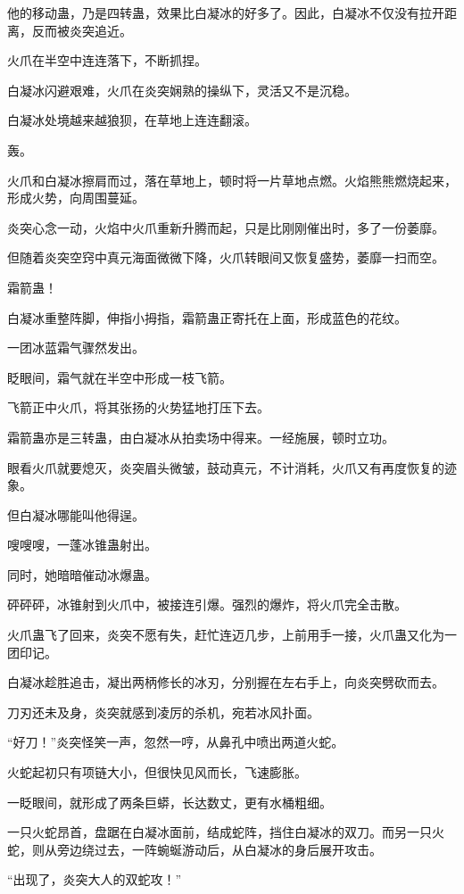 \begin{this_body}
他的移动蛊，乃是四转蛊，效果比白凝冰的好多了。因此，白凝冰不仅没有拉开距离，反而被炎突追近。

火爪在半空中连连落下，不断抓捏。

白凝冰闪避艰难，火爪在炎突娴熟的操纵下，灵活又不是沉稳。

白凝冰处境越来越狼狈，在草地上连连翻滚。

轰。

火爪和白凝冰擦肩而过，落在草地上，顿时将一片草地点燃。火焰熊熊燃烧起来，形成火势，向周围蔓延。

炎突心念一动，火焰中火爪重新升腾而起，只是比刚刚催出时，多了一份萎靡。

但随着炎突空窍中真元海面微微下降，火爪转眼间又恢复盛势，萎靡一扫而空。

霜箭蛊！

白凝冰重整阵脚，伸指小拇指，霜箭蛊正寄托在上面，形成蓝色的花纹。

一团冰蓝霜气骤然发出。

眨眼间，霜气就在半空中形成一枝飞箭。

飞箭正中火爪，将其张扬的火势猛地打压下去。

霜箭蛊亦是三转蛊，由白凝冰从拍卖场中得来。一经施展，顿时立功。

眼看火爪就要熄灭，炎突眉头微皱，鼓动真元，不计消耗，火爪又有再度恢复的迹象。

但白凝冰哪能叫他得逞。

嗖嗖嗖，一蓬冰锥蛊射出。

同时，她暗暗催动冰爆蛊。

砰砰砰，冰锥射到火爪中，被接连引爆。强烈的爆炸，将火爪完全击散。

火爪蛊飞了回来，炎突不愿有失，赶忙连迈几步，上前用手一接，火爪蛊又化为一团印记。

白凝冰趁胜追击，凝出两柄修长的冰刃，分别握在左右手上，向炎突劈砍而去。

刀刃还未及身，炎突就感到凌厉的杀机，宛若冰风扑面。

“好刀！”炎突怪笑一声，忽然一哼，从鼻孔中喷出两道火蛇。

火蛇起初只有项链大小，但很快见风而长，飞速膨胀。

一眨眼间，就形成了两条巨蟒，长达数丈，更有水桶粗细。

一只火蛇昂首，盘踞在白凝冰面前，结成蛇阵，挡住白凝冰的双刀。而另一只火蛇，则从旁边绕过去，一阵蜿蜒游动后，从白凝冰的身后展开攻击。

“出现了，炎突大人的双蛇攻！”


\end{this_body}

